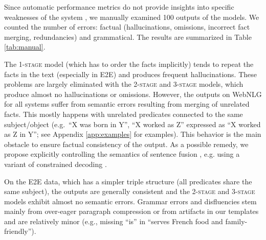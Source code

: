 
Since automatic performance metrics do not provide insights into specific weaknesses of the system \cite{van2021underreporting}, we manually examined 100 outputs of the models. We counted the number of errors: factual (hallucinations, omissions, incorrect fact merging, redundancies) and grammatical. The results are summarized in Table \ref{tab:manual}.

The \textsc{1-stage} model (which has to order the facts implicitly) tends to repeat the facts in the text (especially in E2E) and produces frequent hallucinations. These problems are largely eliminated with the \textsc{2-stage} and \textsc{3-stage} models, which produce almost no hallucinations or omissions.
However, the outputs on WebNLG for all systems suffer from semantic errors resulting from merging of unrelated facts. This mostly happens with unrelated predicates connected to the same subject/object (e.g.\ “X was born in Y”, “X worked as Z” expressed as “X worked as Z in Y”; see Appendix \ref{app:examples} for examples). This behavior is the main obstacle to ensure factual consistency of the output. As a possible remedy, we propose explicitly controlling the semantics of sentence fusion \cite{ben2020semantically}, e.g. using a variant of constrained decoding \cite{balakrishnan2019constrained,wang2021mention}.

On the E2E data, which has a simpler triple structure (all predicates share the same subject), the outputs are generally consistent and the \textsc{2-stage} and \textsc{3-stage} models exhibit almost no semantic errors. Grammar errors and disfluencies stem mainly from over-eager paragraph compression or from artifacts in our templates and are relatively minor (e.g., missing “is” in “serves French food and family-friendly”).



